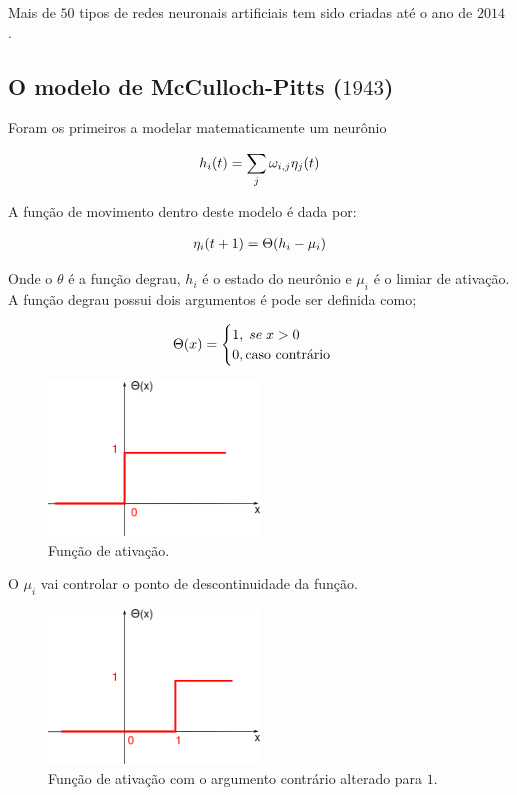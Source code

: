 Mais de $50$ tipos de redes neuronais artificiais tem sido criadas até o ano de $2014$ \citep{Saljooghi2014}.

\subsection{O modelo de McCulloch-Pitts ($1943$)}
Foram os primeiros a modelar matematicamente um neurônio

\begin{eqnarray}
\centering
h_{i}(t)= \sum_{j} \omega_{i,j} \eta_{j}(t)
\end{eqnarray}

A função de movimento dentro deste modelo é dada por:

\begin{eqnarray}
\centering
\eta_{i}(t+1)= \Theta(h_{i}-\mu_{i})
\end{eqnarray}

Onde o $\theta$ é a função degrau, $h_{i}$ é o estado do neurônio e $\mu_{i}$ é o limiar de ativação. A função degrau possui dois argumentos é pode ser definida como;

\begin{eqnarray}
\centering
\Theta(x)=
\begin{cases}
1,\; se\; x>0 \\ 
0, \text{caso contrário}
\end{cases}
\end{eqnarray}


\begin{figure}[H]
	\centering
	\includegraphics[width=0.5\textwidth]{Imagens/Fig9.png}
	\caption{Função de ativação.}
	\label{Degrau}
\end{figure} 

O $\mu_{i}$ vai controlar o ponto de descontinuidade da função.


\begin{figure}[H]
	\centering
	\includegraphics[width=0.5\textwidth]{Imagens/Fig10.png}
	\caption{Função de ativação com o argumento contrário alterado para $1$.}
	\label{Degrau2}
\end{figure} 


